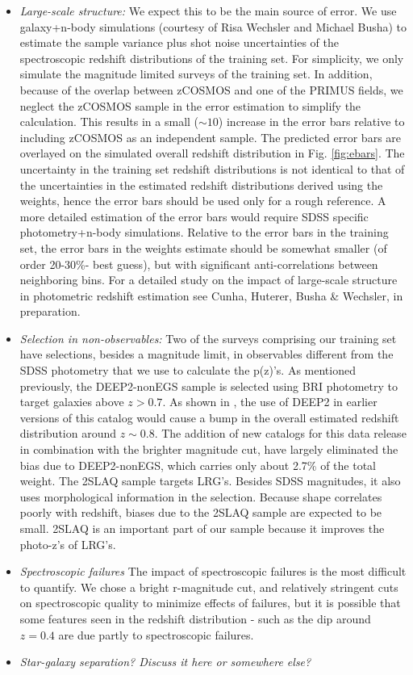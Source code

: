\documentclass[preprint]{aastex}
\begin{document}
\begin{itemize}
\item {\it Large-scale structure:} We expect this to be the main source of error.
We use galaxy+n-body simulations (courtesy of Risa Wechsler and Michael Busha) to 
estimate the sample variance plus shot noise uncertainties of the spectroscopic redshift 
distributions of the training set.
For simplicity, we only simulate the magnitude limited surveys of the training set.
In addition, because of the overlap between zCOSMOS and one of the PRIMUS fields, 
we neglect the zCOSMOS sample in the error estimation to simplify the calculation.
This results in a small ($\sim 10$) increase in the error bars relative to including 
zCOSMOS as an independent sample.
The predicted error bars are overlayed on the simulated overall redshift distribution in Fig. \ref{fig:ebars}.
The uncertainty in the training set redshift distributions is not identical to that of 
the uncertainties in the estimated redshift distributions derived using the weights, hence 
the error bars should be used only for a rough reference.
A more detailed estimation of the error bars would require SDSS specific photometry+n-body simulations.
Relative to the error bars in the training set, the error bars in the weights estimate 
should be somewhat smaller (of order 20-30\%- best guess), but with significant anti-correlations 
between neighboring bins.
For a detailed study on the impact of large-scale structure in photometric redshift estimation see 
Cunha, Huterer, Busha \& Wechsler, in preparation.
\item {\it Selection in non-observables:} Two of the surveys comprising our training set have selections, 
besides a magnitude limit, in observables different from the SDSS photometry that we use to 
calculate the p(z)'s. 
As mentioned previously, the DEEP2-nonEGS sample is selected using BRI photometry to 
target galaxies above $z>0.7$.
As shown in \citet{CunhaPhotoz09}, the use of DEEP2 in earlier versions of this catalog would cause
a bump in the overall estimated redshift distribution around $z\sim 0.8$.
The addition of new catalogs for this data release in combination with the brighter magnitude cut,
have largely eliminated the bias due to DEEP2-nonEGS, which carries only about 2.7\% of the total weight. 
The 2SLAQ sample targets LRG's. 
Besides SDSS magnitudes, it also uses morphological information in the selection.
Because shape correlates poorly with redshift, biases due to the 2SLAQ sample are expected to be small.
2SLAQ is an important part of our sample because it improves the photo-z's of LRG's.
\item {\it Spectroscopic failures} The impact of spectroscopic failures is the most difficult to quantify.
We chose a bright r-magnitude cut, and relatively stringent cuts on spectroscopic quality to minimize 
effects of failures, but it is possible that some features seen in the redshift distribution - such as the 
dip around $z=0.4$ are due partly to spectroscopic failures.
\item {\it Star-galaxy separation? Discuss it here or somewhere else?}

\end{itemize}
\end{document}
